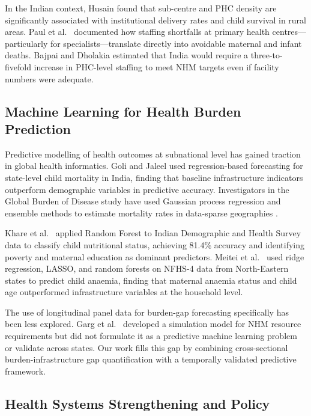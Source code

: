 \documentclass[conference]{IEEEtran}
\begin{document}
In the Indian context, Husain \cite{Husain2011} found that
sub-centre and PHC density are significantly associated with
institutional delivery rates and child survival in rural areas.
Paul et al.\ \cite{Paul2011} documented how staffing shortfalls at
primary health centres---particularly for specialists---translate
directly into avoidable maternal and infant deaths. Bajpai and
Dholakia \cite{Bajpai2011} estimated that India would require a
three-to-fivefold increase in PHC-level staffing to meet NHM
targets even if facility numbers were adequate.

\subsection{Machine Learning for Health Burden Prediction}

Predictive modelling of health outcomes at subnational level has
gained traction in global health informatics. Goli and Jaleel
\cite{Goli2014} used regression-based forecasting for state-level
child mortality in India, finding that baseline infrastructure
indicators outperform demographic variables in predictive accuracy.
Investigators in the Global Burden of Disease study have used
Gaussian process regression and ensemble methods to estimate
mortality rates in data-sparse geographies \cite{GBD_2019_IHME}.

Khare et al.\ \cite{Khare2017} applied Random Forest to Indian
Demographic and Health Survey data to classify child nutritional
status, achieving 81.4\% accuracy and identifying poverty and
maternal education as dominant predictors. Meitei et al.\
\cite{Meitei2022} used ridge regression, LASSO, and random forests
on NFHS-4 data from North-Eastern states to predict child anaemia,
finding that maternal anaemia status and child age outperformed
infrastructure variables at the household level.

The use of longitudinal panel data for burden-gap forecasting
specifically has been less explored. Garg et al.\ \cite{Garg2019}
developed a simulation model for NHM resource requirements but did
not formulate it as a predictive machine learning problem or validate
across states. Our work fills this gap by combining cross-sectional
burden-infrastructure gap quantification with a temporally validated
predictive framework.

\subsection{Health Systems Strengthening and Policy}
\end{document}
